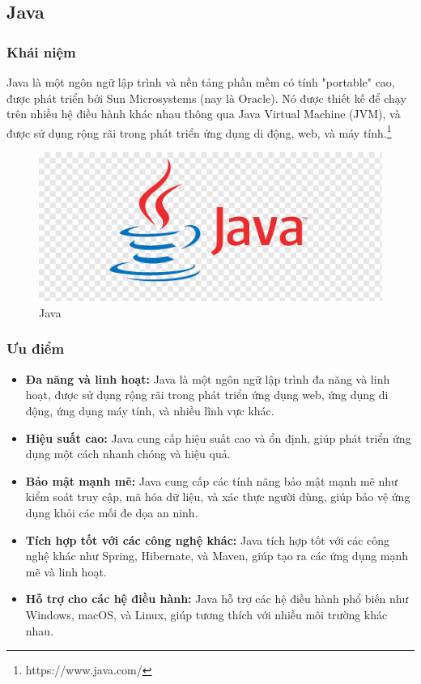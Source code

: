 \subsection{Java}
\subsubsection{Khái niệm}
\noindent Java là một ngôn ngữ lập trình và nền tảng phần mềm có tính "portable" cao, được phát triển bởi Sun Microsystems (nay là Oracle). Nó được thiết kế để chạy trên nhiều hệ điều hành khác nhau thông qua Java Virtual Machine (JVM), và được sử dụng rộng rãi trong phát triển ứng dụng di động, web, và máy tính.\footnote{https://www.java.com/}
\begin{figure}[H]
  \begin{center}
    \includegraphics[scale=0.3]{images/hieu/phuluc/java.png}
    \caption{Java}
  \end{center}
\end{figure}
\subsubsection{Ưu điểm}
\begin{itemize}
  \item \textbf{Đa năng và linh hoạt:} Java là một ngôn ngữ lập trình đa năng và linh hoạt, được sử dụng rộng rãi trong phát triển ứng dụng web, ứng dụng di động, ứng dụng máy tính, và nhiều lĩnh vực khác.
  \item \textbf{Hiệu suất cao:} Java cung cấp hiệu suất cao và ổn định, giúp phát triển ứng dụng một cách nhanh chóng và hiệu quả.
  \item \textbf{Bảo mật mạnh mẽ:} Java cung cấp các tính năng bảo mật mạnh mẽ như kiểm soát truy cập, mã hóa dữ liệu, và xác thực người dùng, giúp bảo vệ ứng dụng khỏi các mối đe dọa an ninh.
  \item \textbf{Tích hợp tốt với các công nghệ khác:} Java tích hợp tốt với các công nghệ khác như Spring, Hibernate, và Maven, giúp tạo ra các ứng dụng mạnh mẽ và linh hoạt.
  \item \textbf{Hỗ trợ cho các hệ điều hành:} Java hỗ trợ các hệ điều hành phổ biến như Windows, macOS, và Linux, giúp tương thích với nhiều môi trường khác nhau.
\end{itemize}
